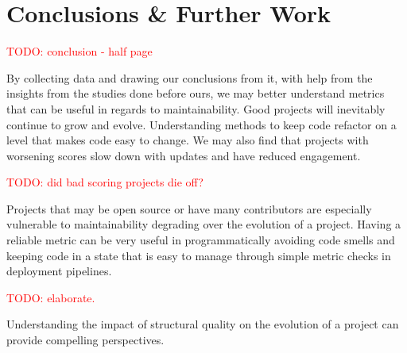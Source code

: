 \documentclass[12pt,conference]{IEEEtran}
\newcommand\todo[1]{\textcolor{red}{#1}}
\begin{document}
\section{Conclusions \& Further Work}
\todo{TODO: conclusion - half page}

By collecting data and drawing our conclusions from it, with help from the insights from the studies done before ours, we may better understand metrics that can be useful in regards to maintainability. Good projects will inevitably continue to grow and evolve. Understanding methods to keep code refactor on a level that makes code easy to change. We may also find that projects with worsening scores slow down with updates and have reduced engagement.

\todo{TODO: did bad scoring projects die off?}

Projects that may be open source or have many contributors are especially vulnerable to maintainability degrading over the evolution of a project. Having a reliable metric can be very useful in programmatically avoiding code smells and keeping code in a state that is easy to manage through simple metric checks in deployment pipelines.

\todo{TODO: elaborate.}

Understanding the impact of structural quality on the evolution of a project can provide compelling perspectives.

\newpage



\end{document}
